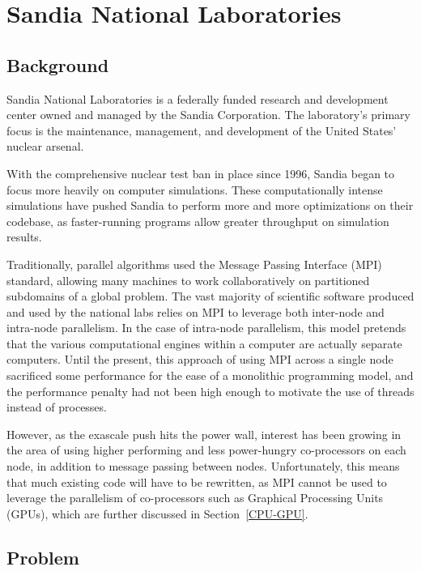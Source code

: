 
\chapter{Sandia National Laboratories}

\section{Background}

Sandia National Laboratories is a federally funded research and development
center owned and managed by the Sandia Corporation.  The laboratory's primary
focus is the maintenance, management, and development of the United States'
nuclear arsenal. 

With the comprehensive nuclear test ban in place since 1996, Sandia began to
focus more heavily on computer simulations. These computationally intense
simulations have pushed Sandia to perform more and more optimizations on their
codebase, as faster-running programs allow greater throughput on simulation
results.

Traditionally, parallel algorithms used the Message Passing Interface (MPI)
standard, allowing many machines to work collaboratively on partitioned
subdomains of a global problem. The vast majority of scientific software
produced and used by the national labs relies on MPI to leverage both inter-node
and intra-node parallelism. In the case of intra-node parallelism, this model
pretends that the various computational engines within a computer are actually
separate computers.  Until the present, this approach of using MPI across a
single node sacrificed some performance for the ease of a monolithic programming
model, and the performance penalty had not been high enough to motivate the
use of threads instead of processes. 

However, as the exascale push hits the power wall, interest has been growing in
the area of using higher performing and less power-hungry co-processors on each
node, in addition to message passing between nodes.  Unfortunately, this means
that much existing code will have to be rewritten, as MPI cannot be used to
leverage the parallelism of co-processors such as Graphical Processing Units
(GPUs), which are further discussed in Section~\ref{CPU-GPU}.

\section{Problem}

